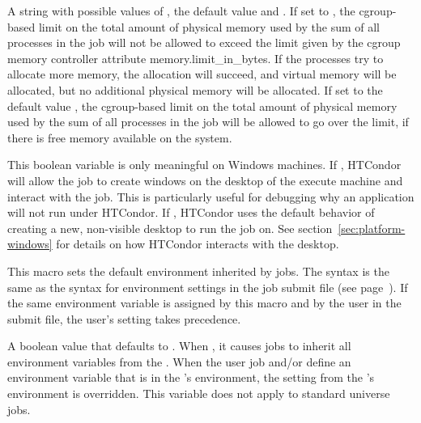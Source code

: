 \begin{description}
\label{param:CgroupMemoryLimitPolicy} 
\item[\Macro{CGROUP\_MEMORY\_LIMIT\_POLICY}]
  A string with possible values of , the default value
   and .
  If set to , the cgroup-based limit on the total amount 
  of physical memory used by the sum of all processes in the job 
  will not be allowed to exceed the limit given by the cgroup memory
  controller attribute memory.limit\_in\_bytes.
  If the processes try to allocate more memory, 
  the allocation will succeed, and virtual memory will be allocated, 
  but no additional physical memory will be allocated.
  If set to the default value , 
  the cgroup-based limit on the total amount 
  of physical memory used by the sum of all processes in the job 
  will be allowed to go over the limit, 
  if there is free memory available on the system.

\label{param:UseVisibleDesktop} 
\item[\Macro{USE\_VISIBLE\_DESKTOP}]
  This boolean variable is only meaningful on Windows machines.  
  If , HTCondor will
  allow the job to create windows on the desktop of the execute machine and
  interact with the job.  This is particularly useful for debugging why an
  application will not run under HTCondor.  
  If , HTCondor uses the default
  behavior of creating a new, non-visible desktop to run the job on.
  See section~\ref{sec:platform-windows} for details on how HTCondor 
  interacts with the desktop.

\label{param:StarterJobEnvironment}
\item[\Macro{STARTER\_JOB\_ENVIRONMENT}]
  This macro sets the default environment inherited by jobs.  The syntax is
  the same as the syntax for environment settings in the job submit file
  (see page~\pageref{man-condor-submit-environment}).
  If the same environment variable is assigned by this macro and by the user
  in the submit file, the user's setting takes precedence.

\label{param:JobInheritsStarterEnvironment} 
\item[\Macro{JOB\_INHERITS\_STARTER\_ENVIRONMENT}]
  A boolean value that defaults to .
  When ,
  it causes jobs to inherit all environment variables from 
  the .
  When the user job and/or  define
  an environment variable that is in the 's
  environment, the setting from the 's environment
  is overridden.
  This variable does not apply to standard universe jobs.


\end{description}
